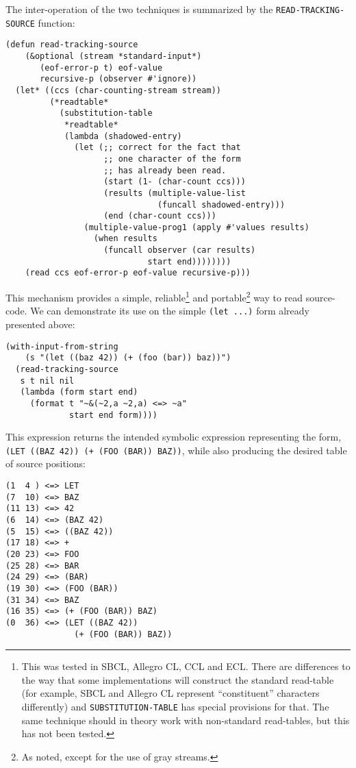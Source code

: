 \documentclass[format=sigconf]{acmart}
\begin{document}
The inter-operation of the two techniques is summarized by the
\texttt{READ-TRACKING-SOURCE} function:

\begin{verbatim}
(defun read-tracking-source
    (&optional (stream *standard-input*)
       (eof-error-p t) eof-value
       recursive-p (observer #'ignore))
  (let* ((ccs (char-counting-stream stream))
         (*readtable*
           (substitution-table
            *readtable*
            (lambda (shadowed-entry)
              (let (;; correct for the fact that
                    ;; one character of the form
                    ;; has already been read.
                    (start (1- (char-count ccs)))
                    (results (multiple-value-list
                               (funcall shadowed-entry)))
                    (end (char-count ccs)))
                (multiple-value-prog1 (apply #'values results)
                  (when results
                    (funcall observer (car results)
                             start end))))))))
    (read ccs eof-error-p eof-value recursive-p)))
\end{verbatim}

This mechanism provides a simple, reliable\footnote{This was tested in
  SBCL, Allegro CL, CCL and ECL.  There are differences to the way
  that some implementations will construct the standard read-table
  (for example, SBCL and Allegro CL represent ``constituent''
  characters differently) and \texttt{SUBSTITUTION-TABLE} has special
  provisions for that.  The same technique should in theory work with
  non-standard read-tables, but this has not been tested.} and
portable\footnote{As noted, except for the use of gray streams.}  way
to read source-code.  We can demonstrate its use on the simple
\texttt{(let ...)} form already presented above:

\begin{verbatim}
(with-input-from-string
    (s "(let ((baz 42)) (+ (foo (bar)) baz))")
  (read-tracking-source
   s t nil nil
   (lambda (form start end)
     (format t "~&(~2,a ~2,a) <=> ~a"
             start end form))))
\end{verbatim}

This expression returns the intended symbolic expression representing
the form, \texttt{(LET ((BAZ 42)) (+ (FOO (BAR)) BAZ))}, while also
producing the desired table of source positions:

\begin{verbatim}
(1  4 ) <=> LET
(7  10) <=> BAZ
(11 13) <=> 42
(6  14) <=> (BAZ 42)
(5  15) <=> ((BAZ 42))
(17 18) <=> +
(20 23) <=> FOO
(25 28) <=> BAR
(24 29) <=> (BAR)
(19 30) <=> (FOO (BAR))
(31 34) <=> BAZ
(16 35) <=> (+ (FOO (BAR)) BAZ)
(0  36) <=> (LET ((BAZ 42))
              (+ (FOO (BAR)) BAZ))
\end{verbatim}
\end{document}
